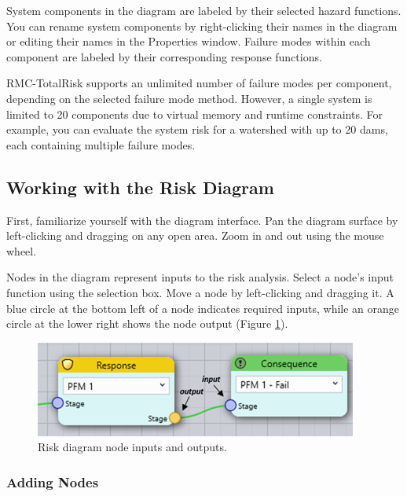 \documentclass[
]{book}
\begin{document}
System components in the diagram are labeled by their selected hazard functions. You can rename system components by right-clicking their names in the diagram or editing their names in the Properties window. Failure modes within each component are labeled by their corresponding response functions.

RMC-TotalRisk supports an unlimited number of failure modes per component, depending on the selected failure mode method. However, a single system is limited to 20 components due to virtual memory and runtime constraints. For example, you can evaluate the system risk for a watershed with up to 20 dams, each containing multiple failure modes.

\hypertarget{working-with-the-risk-diagram}{%
\subsection{Working with the Risk Diagram}\label{working-with-the-risk-diagram}}

First, familiarize yourself with the diagram interface. Pan the diagram surface by left-clicking and dragging on any open area. Zoom in and out using the mouse wheel.

Nodes in the diagram represent inputs to the risk analysis. Select a node's input function using the selection box. Move a node by left-clicking and dragging it. A blue circle at the bottom left of a node indicates required inputs, while an orange circle at the lower right shows the node output (Figure \ref{fig:figure-132}).

\begin{figure}

{\centering \includegraphics{images/figure132} 

}

\caption{Risk diagram node inputs and outputs.}\label{fig:figure-132}
\end{figure}

\hypertarget{adding-nodes}{%
\subsubsection*{Adding Nodes}\label{adding-nodes}}
\end{document}
